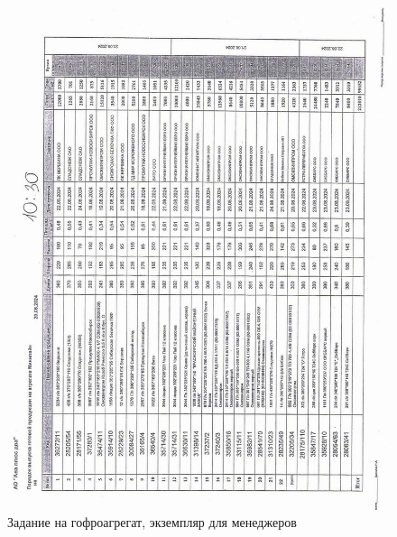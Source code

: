 \begin{figure}
\begin{center}
 \includegraphics[width=\linewidth, height=0.94\textheight, keepaspectratio]{Pics/d12_2.jpg}
\end{center}
 \caption{Задание на гофроагрегат, экземпляр для менеджеров}
 \label{pic:d12}
\end{figure}

